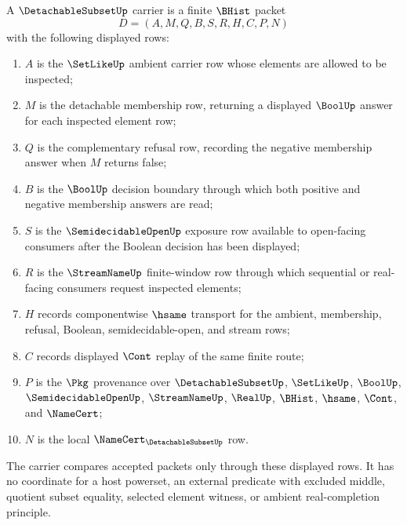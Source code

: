 \begin{definition}
\label{def:detachable-subset-carrier}
A $\DetachableSubsetUp$ carrier is a finite $\BHist$ packet
$$
D=(A,M,Q,B,S,R,H,C,P,N)
$$
with the following displayed rows:
\begin{enumerate}
\item $A$ is the $\SetLikeUp$ ambient carrier row whose elements are allowed to be inspected;
\item $M$ is the detachable membership row, returning a displayed $\BoolUp$ answer for each inspected element row;
\item $Q$ is the complementary refusal row, recording the negative membership answer when $M$ returns false;
\item $B$ is the $\BoolUp$ decision boundary through which both positive and negative membership answers are read;
\item $S$ is the $\SemidecidableOpenUp$ exposure row available to open-facing consumers after the Boolean decision has been displayed;
\item $R$ is the $\StreamNameUp$ finite-window row through which sequential or real-facing consumers request inspected elements;
\item $H$ records componentwise $\hsame$ transport for the ambient, membership, refusal, Boolean, semidecidable-open, and stream rows;
\item $C$ records displayed $\Cont$ replay of the same finite route;
\item $P$ is the $\Pkg$ provenance over $\DetachableSubsetUp$, $\SetLikeUp$, $\BoolUp$, $\SemidecidableOpenUp$, $\StreamNameUp$, $\RealUp$, $\BHist$, $\hsame$, $\Cont$, and $\NameCert$;
\item $N$ is the local $\NameCert_{\DetachableSubsetUp}$ row.
\end{enumerate}
The carrier compares accepted packets only through these displayed rows. It has no coordinate for a host powerset, an external predicate with excluded middle, quotient subset equality, selected element witness, or ambient real-completion principle.
\end{definition}

